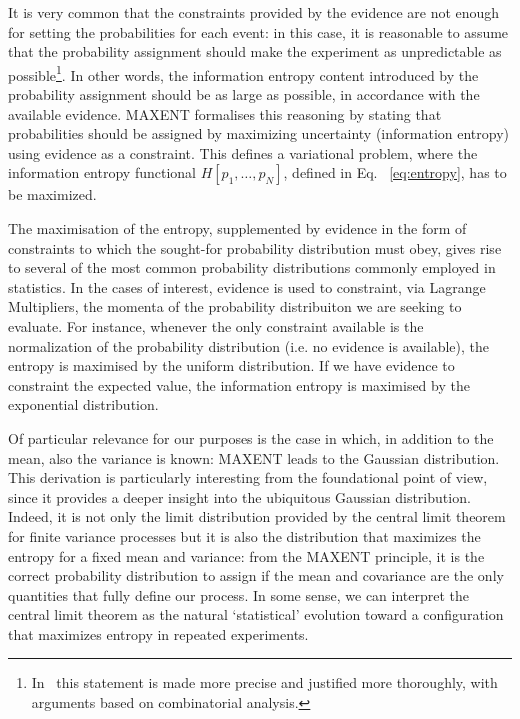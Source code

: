 \documentclass{aa}
\begin{document}
It is very common that the constraints provided by the evidence are not enough for setting the probabilities for each event: in this case, it is reasonable to assume that the probability assignment should make the experiment as unpredictable as possible\footnote{
In~\citet{Jaynes_MAXENT} this statement is made more precise and justified more thoroughly, with arguments based on combinatorial analysis.
}.
In other words, the information entropy content introduced by the probability assignment should be as large as possible, in accordance with the available evidence. MAXENT formalises this reasoning by stating that probabilities should be assigned by maximizing uncertainty (information entropy) using evidence as a constraint. 
This defines a variational problem, where the information entropy functional $H\left[p_1, \dots, p_N\right]$, defined in Eq. ~\eqref{eq:entropy}, has to be maximized. 

The maximisation of the entropy, supplemented by evidence in the form of constraints to which the sought-for probability distribution must obey, gives rise to several of the most common probability distributions commonly employed in statistics. In the cases of interest, evidence is used to constraint, via Lagrange Multipliers, the momenta of the probability distribuiton we are seeking to evaluate. For instance, whenever the only constraint available is the normalization of the probability distribution (i.e. no evidence is available), the entropy is maximised by the uniform distribution. If we have evidence to constraint the expected value, the information entropy is maximised by the exponential distribution.

Of particular relevance for our purposes is the case in which, in addition to the mean, also the variance is known: MAXENT leads to the Gaussian distribution. 
This derivation is particularly interesting from the foundational point of view, since it provides a deeper insight into the ubiquitous Gaussian distribution.
Indeed, it is not only the limit distribution provided by the central limit theorem for finite variance processes but it is also the distribution that maximizes the entropy for a fixed mean and variance: from the MAXENT principle, it is the correct probability distribution to assign if the mean and covariance are the only quantities that fully define our process. In some sense, we can interpret the central limit theorem as the natural `statistical' evolution toward a configuration that maximizes entropy in repeated experiments.
\end{document}
